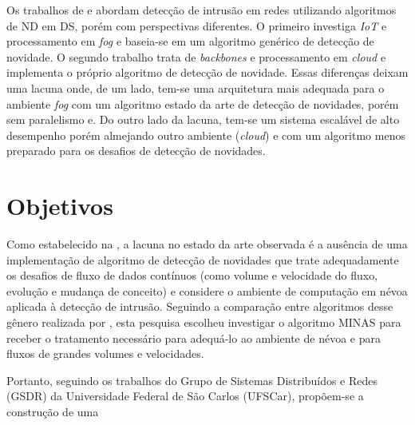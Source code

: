 Os trabalhos de  e  abordam
detecção de intrusão em redes utilizando algoritmos de ND em DS, porém com
perspectivas diferentes.
O primeiro investiga \emph{IoT} e processamento em \emph{fog} e baseia-se em um
algoritmo genérico de detecção de novidade.
O segundo trabalho trata de \emph{backbones} e processamento em \emph{cloud} e
implementa o próprio algoritmo de detecção de novidade.
Essas diferenças deixam uma lacuna onde, de um lado, tem-se uma
arquitetura mais adequada para o ambiente \emph{fog} com um algoritmo estado da arte de
detecção de novidades, porém sem paralelismo e.
Do outro lado da lacuna, tem-se um sistema
escalável de alto desempenho porém almejando outro ambiente (\emph{cloud}) e
com um algoritmo menos preparado para os desafios de detecção de 
novidades.
% 


\section{Objetivos}\label{sec:objetivos}


Como estabelecido na , a lacuna no estado da arte observada é
a ausência de uma implementação de algoritmo de detecção de
novidades que trate adequadamente os desafios de fluxo de dados contínuos
(como volume e velocidade do fluxo, evolução e mudança de conceito)
e considere o ambiente de computação em névoa aplicada à detecção de
intrusão.
Seguindo a comparação entre algoritmos desse gênero realizada por
, esta pesquisa escolheu investigar o algoritmo MINAS \cite{Faria2015minas}
para receber o tratamento necessário para adequá-lo ao ambiente de névoa e para
fluxos de grandes volumes e velocidades.


Portanto, seguindo os trabalhos do Grupo de Sistemas Distribuídos e Redes
(GSDR) da Universidade Federal de São Carlos (UFSCar), propõem-se a construção
de uma 

